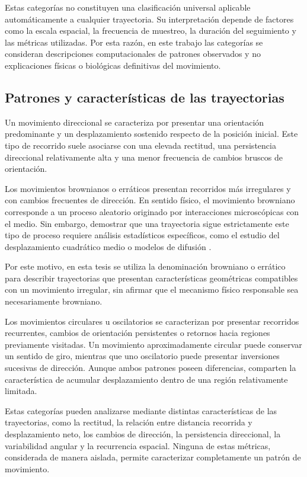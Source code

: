 Estas categorías no constituyen una clasificación universal aplicable automáticamente a cualquier trayectoria. Su interpretación depende de factores como la escala espacial, la frecuencia de muestreo, la duración del seguimiento y las métricas utilizadas. Por esta razón, en este trabajo las categorías se consideran descripciones computacionales de patrones observados y no explicaciones físicas o biológicas definitivas del movimiento.

\subsection{Patrones y características de las trayectorias}

Un movimiento direccional se caracteriza por presentar una orientación predominante y un desplazamiento sostenido respecto de la posición inicial. Este tipo de recorrido suele asociarse con una elevada rectitud, una persistencia direccional relativamente alta y una menor frecuencia de cambios bruscos de orientación.

Los movimientos brownianos o erráticos presentan recorridos más irregulares y con cambios frecuentes de dirección. En sentido físico, el movimiento browniano corresponde a un proceso aleatorio originado por interacciones microscópicas con el medio. Sin embargo, demostrar que una trayectoria sigue estrictamente este tipo de proceso requiere análisis estadísticos específicos, como el estudio del desplazamiento cuadrático medio o modelos de difusión \cite{saxton1997,codling2008,monnier2012}.

Por este motivo, en esta tesis se utiliza la denominación browniano o errático para describir trayectorias que presentan características geométricas compatibles con un movimiento irregular, sin afirmar que el mecanismo físico responsable sea necesariamente browniano.

Los movimientos circulares u oscilatorios se caracterizan por presentar recorridos recurrentes, cambios de orientación persistentes o retornos hacia regiones previamente visitadas. Un movimiento aproximadamente circular puede conservar un sentido de giro, mientras que uno oscilatorio puede presentar inversiones sucesivas de dirección. Aunque ambos patrones poseen diferencias, comparten la característica de acumular desplazamiento dentro de una región relativamente limitada.

Estas categorías pueden analizarse mediante distintas características de las trayectorias, como la rectitud, la relación entre distancia recorrida y desplazamiento neto, los cambios de dirección, la persistencia direccional, la variabilidad angular y la recurrencia espacial. Ninguna de estas métricas, considerada de manera aislada, permite caracterizar completamente un patrón de movimiento.

